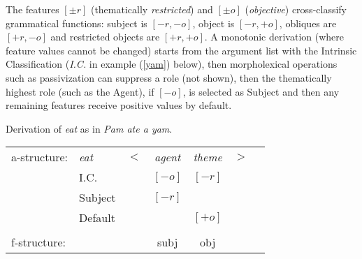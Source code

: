 \begin{sloppypar}
\noindent  
The features $[\pm r]$ (thematically \textit{restricted}) and $[\pm o]$ (\textit{objective}) cross-classify grammatical functions: subject is $[-r, -o]$, object is $[-r, +o]$, obliques are $[+r, -o]$ and
restricted objects are $[+r, +o]$.   A monotonic derivation (where feature values cannot be changed) starts from the argument list with the Intrinsic Classification (\textit{I.C.} in example  (\ref{yam}) below), then morpholexical operations such as passivization can suppress a role (not shown), then the thematically highest role (such as the Agent), if $[-o]$, is selected as Subject %
and then any remaining features receive positive values by default.
\end{sloppypar}

 \begin{exe}
\ex\label{yam}{Derivation of \textit{eat} as in \textit{Pam ate a yam}.\\
\begin{tabular}[t]{@{}lllccll}
a-structure: &{\it eat}& $<$& \textit{agent} & \textit{theme}   & $>$ & \\
             & I.C.      &    & $[-o]$ & $[-r]$   &   & \\
             &  Subject     &    & $[-r]$ &            &              & \\
             &  Default     &    &     & $[+o]$   &   & \\
             &       &    &\vline    & \vline &    & \\
f-structure: &       &    &{\sc subj} &{\sc obj}  &   &
\end{tabular}
  }
\end{exe}

